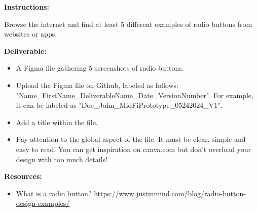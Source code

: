 \makeheaderfiles

\textbf{Instructions:}

Browse the internet and find at least 5 different examples of radio buttons from websites or apps.

\textbf{Deliverable:}

\begin{itemize}
\item A Figma file gathering 5 screenshots of radio buttons.
\item Upload the Figma file on Github, labeled as follows: "Name\_FirstName\_DeliverableName\_Date\_VersionNumber". For example, it can be labeled as "Doe\_John\_MidFiPrototype\_05242024\_V1".
\item Add a title within the file.
\item Pay attention to the global aspect of the file. It must be clear, simple and easy to read. You can get inspiration on canva.com but don't overload your design with too much details!
\end{itemize}

\textbf{Resources:}

\begin{itemize}
\item What is a radio button? \url{https://www.justinmind.com/blog/radio-button-design-examples/}
\end{itemize}


